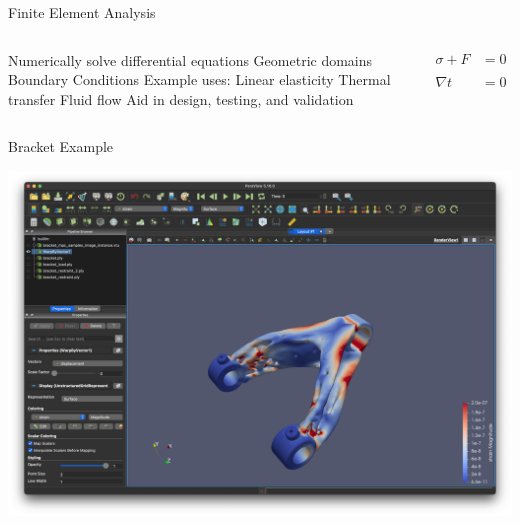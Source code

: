 \begin{frame}{Finite Element Analysis}
\begin{columns}
\centering
\begin{outline}
  \1 Numerically solve differential equations
  \2 Geometric domains
  \2 Boundary Conditions
  \1 Example uses:
  \2 Linear elasticity
  \2 Thermal transfer
  \2 Fluid flow
  \1 Aid in design, testing, and validation
\end{outline}

\begin{center}
\begin{align*}
  \sigma + F &= 0\\
             &\\
  \nabla t &= 0
\end{align*}


\end{center}
\end{columns}
\end{frame}

\begin{frame}{Bracket Example}
  \centering
  \begin{center}
    \includegraphics[width=0.7\linewidth]{bracket_demo.png}
  \end{center}
\end{frame}


